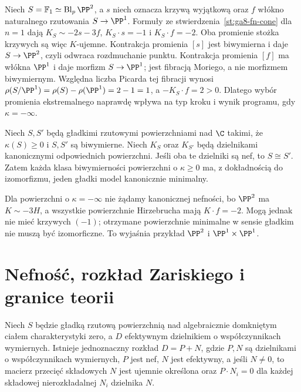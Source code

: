 \begin{przyklad}
\label{prz:ga8-f1-two-rays}
Niech $S=\mathbb F_1\simeq\operatorname{Bl}_p\PP^2$, a $s$
niech oznacza krzywą wyjątkową oraz $f$ włókno
naturalnego rzutowania $S\to\PP^1$. Formuły
ze stwierdzenia~\ref{st:ga8-fn-cone} dla $n=1$ dają
$K_S\sim-2s-3f$, $K_S\cdot s=-1$ i $K_S\cdot f=-2$.
Oba promienie stożka krzywych są więc $K$-ujemne.
Kontrakcja promienia $[s]$ jest biwymierna i daje
$S\to\PP^2$, czyli odwraca rozdmuchanie punktu.
Kontrakcja promienia $[f]$ ma włókna $\PP^1$
i daje morfizm $S\to\PP^1$; jest fibracją Moriego,
a nie morfizmem biwymiernym. Względna liczba Picarda tej fibracji wynosi
$\rho(S/\PP^1)=\rho(S)-\rho(\PP^1)=2-1=1$,
a $-K_S\cdot f=2>0$.
Dlatego wybór promienia ekstremalnego naprawdę wpływa
na typ kroku i wynik programu, gdy $\kappa=-\infty$.
\end{przyklad}

\begin{twierdzenie}
\label{tw:ga8-minimal-unique}
Niech $S,S'$ będą gładkimi rzutowymi powierzchniami
nad $\C$ takimi, że $\kappa(S)\ge0$ i $S,S'$
są biwymierne. Niech $K_S$ oraz $K_{S'}$ będą
dzielnikami kanonicznymi odpowiednich powierzchni.
Jeśli oba te dzielniki są nef, to $S\cong S'$. Zatem każda klasa biwymierności
powierzchni o $\kappa\ge0$ ma, z dokładnością do
izomorfizmu, jeden gładki model kanonicznie minimalny.
\end{twierdzenie}
\begin{uwaga}
Dla powierzchni o $\kappa=-\infty$ nie żądamy
kanonicznej nefności, bo $\PP^2$ ma $K\sim-3H$,
a wszystkie powierzchnie Hirzebrucha mają
$K\cdot f=-2$. Mogą jednak nie mieć krzywych
$(-1)$; otrzymane powierzchnie minimalne w sensie gładkim
nie muszą być izomorficzne. To wyjaśnia przykład
$\PP^2$ i $\PP^1\times\PP^1$.
\end{uwaga}

\section{Nefność, rozkład Zariskiego i granice teorii}
\label{sec:ga8-zariski-decomposition}

\begin{twierdzenie}
\label{tw:ga8-zariski-decomposition}
Niech $S$ będzie gładką rzutową powierzchnią nad
algebraicznie domkniętym ciałem charakterystyki zero,
a $D$ efektywnym dzielnikiem o współczynnikach wymiernych.
Istnieje jednoznaczny rozkład $D=P+N$, gdzie
$P,N$ są dzielnikami o współczynnikach wymiernych,
$P$ jest nef, $N$ jest efektywny, a jeśli $N\ne0$,
to macierz przecięć składowych $N$ jest ujemnie
określona oraz $P\cdot N_i=0$ dla każdej składowej
nierozkładalnej $N_i$ dzielnika $N$.
\end{twierdzenie}

